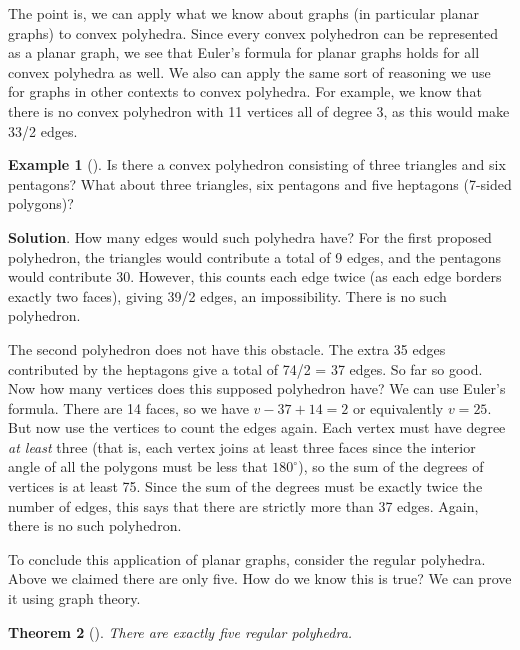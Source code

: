 \documentclass[10pt,]{book}
\theoremstyle{plain}
\newtheorem{theorem}{Theorem}[section]
\theoremstyle{definition}
\theoremstyle{definition}
\newtheorem{example}[theorem]{Example}
\theoremstyle{definition}
\theoremstyle{definition}
\numberwithin{equation}{chapter}
\begin{document}
\par
\hypertarget{p-268}{}%
The point is, we can apply what we know about graphs (in particular planar graphs) to convex polyhedra. Since every convex polyhedron can be represented as a planar graph, we see that Euler's formula for planar graphs holds for all convex polyhedra as well. We also can apply the same sort of reasoning we use for graphs in other contexts to convex polyhedra. For example, we know that there is no convex polyhedron with 11 vertices all of degree 3, as this would make 33/2 edges.%
\begin{example}[]\label{example-7}
\hypertarget{p-269}{}%
Is there a convex polyhedron consisting of three triangles and six pentagons? What about three triangles, six pentagons and five heptagons (7-sided polygons)?%
\par\smallskip%
\noindent\textbf{Solution}.\hypertarget{solution-25}{}\quad%
\hypertarget{p-270}{}%
How many edges would such polyhedra have? For the first proposed polyhedron, the triangles would contribute a total of 9 edges, and the pentagons would contribute 30. However, this counts each edge twice (as each edge borders exactly two faces), giving 39/2 edges, an impossibility. There is no such polyhedron.%
\par
\hypertarget{p-271}{}%
The second polyhedron does not have this obstacle. The extra 35 edges contributed by the heptagons give a total of 74/2 = 37 edges. So far so good. Now how many vertices does this supposed polyhedron have? We can use Euler's formula. There are 14 faces, so we have \(v - 37 + 14 = 2\) or equivalently \(v = 25\). But now use the vertices to count the edges again. Each vertex must have degree \emph{at least} three (that is, each vertex joins at least three faces since the interior angle of all the polygons must be less that \(180^\circ\)), so the sum of the degrees of vertices is at least 75. Since the sum of the degrees must be exactly twice the number of edges, this says that there are strictly more than 37 edges. Again, there is no such polyhedron.%
\end{example}
\hypertarget{p-272}{}%
To conclude this application of planar graphs, consider the regular polyhedra. Above we claimed there are only five. How do we know this is true? We can prove it using graph theory.%
\begin{theorem}[{}]\label{theorem-5}
\hypertarget{p-273}{}%
There are exactly five regular polyhedra.%
\end{theorem}
\end{document}
